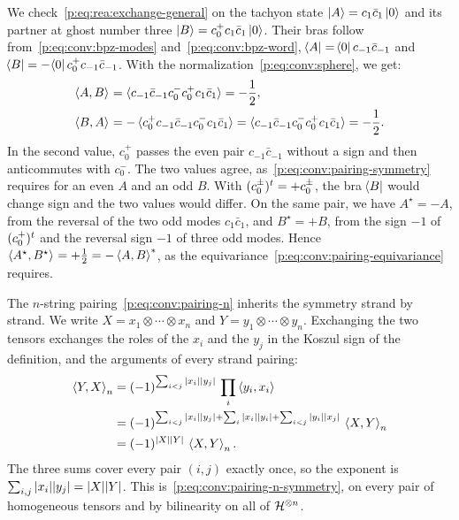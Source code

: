 We check~\eqref{p:eq:rea:exchange-general} on the tachyon state $\ket{A} = c_1 \bar c_1 \ket{0}$ and its partner at ghost number three $\ket{B} = c_0^+ c_1 \bar c_1 \ket{0}$.
Their bras follow from~\eqref{p:eq:conv:bpz-modes} and~\eqref{p:eq:conv:bpz-word}, $\bra{A} = \bra{0} c_{-1} \bar c_{-1}$ and $\bra{B} = - \bra{0} c_0^+ c_{-1} \bar c_{-1}$.
  With the normalization~\eqref{p:eq:conv:sphere}, we get:
\begin{equation}
  \label{p:eq:rea:check-values}
  \begin{aligned}
    \pair{A}{B}
      &
      = \braket{c_{-1} \bar c_{-1} c_0^- c_0^+ c_1 \bar c_1}
      = - \frac{1}{2},
    \\
    \pair{B}{A}
      &
      = - \braket{c_0^+ c_{-1} \bar c_{-1} c_0^- c_1 \bar c_1}
      = \braket{c_{-1} \bar c_{-1} c_0^- c_0^+ c_1 \bar c_1}
      = - \frac{1}{2}.
  \end{aligned}
\end{equation}
In the second value, $c_0^+$ passes the even pair $c_{-1} \bar c_{-1}$ without a sign and then anticommutes with $c_0^-$.
The two values agree, as~\eqref{p:eq:conv:pairing-symmetry} requires for an even $A$ and an odd $B$.
  With $\transp{(c_0^\pm)} = + c_0^\pm$, the bra $\bra{B}$ would change sign and the two values would differ.
On the same pair, we have $A^\star = - A$, from the reversal of the two odd modes $c_1 \bar c_1$, and $B^\star = + B$, from the sign $- 1$ of $\transp{(c_0^+)}$ and the reversal sign $- 1$ of three odd modes.
  Hence $\pair{A^\star}{B^\star} = + \tfrac{1}{2} = - \pair{A}{B}^*$, as the equivariance~\eqref{p:eq:conv:pairing-equivariance} requires.

The $n$-string pairing~\eqref{p:eq:conv:pairing-n} inherits the symmetry strand by strand.
We write $X = x_1 \otimes \cdots \otimes x_n$ and $Y = y_1 \otimes \cdots \otimes y_n$.
Exchanging the two tensors exchanges the roles of the $x_i$ and the $y_j$ in the Koszul sign of the definition, and the arguments of every strand pairing:
\begin{equation}
  \label{p:eq:rea:exchange-n}
  \begin{aligned}
    \pair[n]{Y}{X}
      &
      = (-1)^{\sum_{i < j} \abs{x_i} \abs{y_j}} \, \prod_i \pair{y_i}{x_i}
      \\ &
      = (-1)^{\sum_{i < j} \abs{x_i} \abs{y_j} + \sum_i \abs{x_i} \abs{y_i} + \sum_{i < j} \abs{y_i} \abs{x_j}} \, \pair[n]{X}{Y}
      \\ &
      = (-1)^{\abs{X} \abs{Y}} \, \pair[n]{X}{Y}.
  \end{aligned}
\end{equation}
The three sums cover every pair $(i, j)$ exactly once, so the exponent is $\sum_{i, j} \abs{x_i} \abs{y_j} = \abs{X} \abs{Y}$.
This is~\eqref{p:eq:conv:pairing-n-symmetry}, on every pair of homogeneous tensors and by bilinearity on all of $\Hs^{\otimes n}$.

